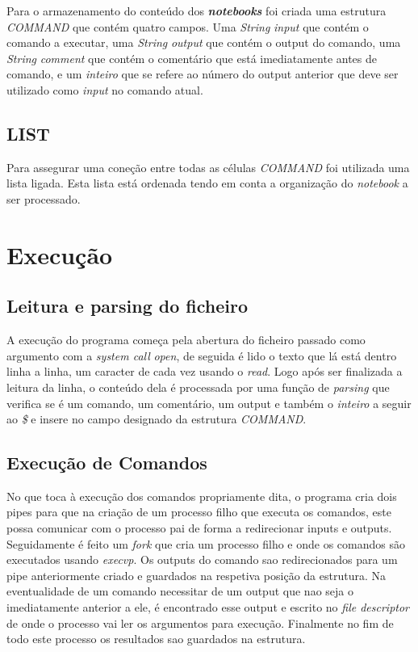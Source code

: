 Para o armazenamento do conteúdo dos \textbf{\textit{notebooks}} foi criada uma estrutura \textit{COMMAND} que contém quatro campos. Uma \textit{String} \textit{\textit{input}} que contém o comando a executar, uma \textit{String} \textit{\textit{output}} que contém o output do comando, uma \textit{String} \textit{\textit{comment}} que contém o comentário que está imediatamente antes de comando, e um \textit{inteiro} que se refere ao número do output anterior que deve ser utilizado como \textit{input} no comando atual. 

\subsection{LIST}

Para assegurar uma coneção entre todas as células \textit{COMMAND} foi utilizada uma lista ligada. Esta lista está ordenada tendo em conta a organização do \textit{\textit{notebook}} a ser processado.


\section{Execução}

\subsection{Leitura e parsing do ficheiro}
A execução do programa começa pela abertura do ficheiro passado como argumento com a \textit{system call} \textit{\textit{open}}, de seguida é lido o texto que lá está dentro linha a linha, um caracter de cada vez usando o \textit{\textit{read}}. Logo após ser finalizada a leitura da linha, o conteúdo dela é processada por uma função de \textit{parsing} que verifica se é um comando, um comentário, um  output e também o \textit{inteiro} a seguir ao \textit{\$} e insere no campo designado da estrutura \textit{COMMAND}.

\subsection{Execução de Comandos}
No que toca à execução dos comandos propriamente dita, o programa cria dois pipes para que na criação de um processo filho que executa os comandos, este possa comunicar com o processo pai de forma a redirecionar inputs e outputs. Seguidamente é feito um \textit{\textit{fork}} que cria um processo filho e onde os comandos são executados usando \textit{\textit{execvp}}. Os outputs do comando sao redirecionados para um pipe anteriormente criado e guardados na respetiva posição da estrutura. Na eventualidade de um comando necessitar de um output que nao seja o imediatamente anterior a ele, é encontrado esse output e escrito no \textit{file descriptor} de onde o processo vai ler os argumentos para execução. Finalmente no fim de todo este processo os resultados sao guardados na estrutura.


